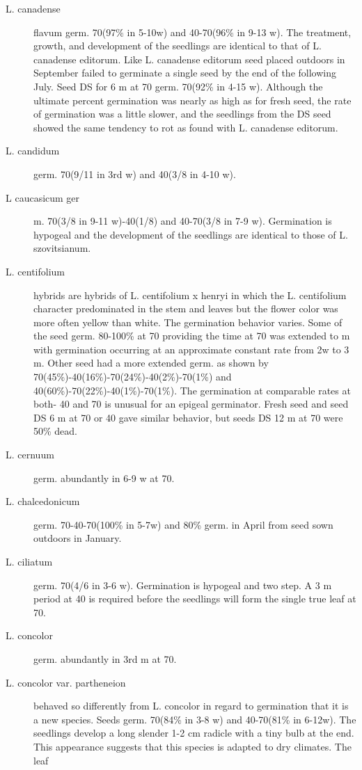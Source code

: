 \begin{description}
\item[L. canadense] flavum germ. 70(97\% in 5-10w) and 40-70(96\% in 9-13 w). The
treatment, growth, and development of the seedlings are identical to that of L.
canadense editorum. Like L. canadense editorum seed placed outdoors in
September failed to germinate a single seed by the end of the following July. Seed
DS for 6 m at 70 germ. 70(92\% in 4-15 w). Although the ultimate percent germination
was nearly as high as for fresh seed, the rate of germination was a little slower, and
the seedlings from the DS seed showed the same tendency to rot as found with L.
canadense editorum.
\item[L. candidum] germ. 70(9/11 in 3rd w) and 40(3/8 in 4-10 w).
\item[L caucasicum ger]m. 70(3/8 in 9-11 w)-40(1/8) and 40-70(3/8 in 7-9 w).
Germination is hypogeal and the development of the seedlings are identical to those
of L. szovitsianum.
\item[L. centifolium] hybrids are hybrids of L. centifolium x henryi in which the L.
centifolium character predominated in the stem and leaves but the flower color was
more often yellow than white. The germination behavior varies. Some of the seed
germ. 80-100\% at 70 providing the time at 70 was extended to m with germination
occurring at an approximate constant rate from 2w to 3 m. Other seed had a more
extended germ. as shown by 70(45\%)-40(16\%)-70(24\%)-40(2\%)-70(1\%) and
40(60\%)-70(22\%)-40(1\%)-70(1\%). The germination at comparable rates at both- 40
and 70 is unusual for an epigeal germinator. Fresh seed and seed DS 6 m at 70 or 40
gave similar behavior, but seeds DS 12 m at 70 were 50\% dead.
\item[L. cernuum] germ. abundantly in 6-9 w at 70.
\item[L. chalcedonicum] germ. 70-40-70(100\% in 5-7w) and 80\% germ. in April from
seed sown outdoors in January.
\item[L. ciliatum] germ. 70(4/6 in 3-6 w). Germination is hypogeal and two step. A 3 m
period at 40 is required before the seedlings will form the single true leaf at 70.
\item[L. concolor] germ. abundantly in 3rd m at 70.
\item[L. concolor var. partheneion] behaved so differently from L. concolor in regard to
germination that it is a new species. Seeds germ. 70(84\% in 3-8 w) and 40-70(81\% in
6-12w). The seedlings develop a long slender 1-2 cm radicle with a tiny bulb at the
end. This appearance suggests that this species is adapted to dry climates. The leaf

\end{description}
